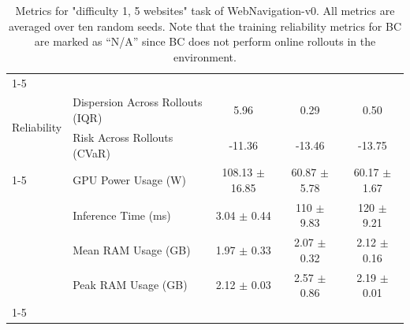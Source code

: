 \begin{table}[!htbp]
{\begin{tabular}{|l|l|c|c|c|}
\cline{1-5}
\midrule
\multicolumn{5}{|c|}{\textbf{Difficulty 1, 5 Websites (Inference)}} \\

\multirow[t]{2}{*}{Reliability} & Dispersion Across Rollouts (IQR) & 5.96 & 0.29 & 0.50 \\
 & Risk Across Rollouts (CVaR) & -11.36 & -13.46 & -13.75 \\
\cline{1-5}
\multirow[t]{4}{*}{System} & GPU Power Usage (W) & 108.13 $\pm$ 16.85 & 60.87 $\pm$ 5.78 & 60.17 $\pm$ 1.67 \\
 & Inference Time (ms) & 3.04 $\pm$ 0.44 & 110 $\pm$ 9.83 & 120 $\pm$ 9.21 \\

 & Mean RAM Usage (GB) & 1.97 $\pm$ 0.33 & 2.07 $\pm$ 0.32 & 2.12 $\pm$ 0.16 \\
 & Peak RAM Usage (GB) & 2.12 $\pm$ 0.03 & 2.57 $\pm$ 0.86 & 2.19 $\pm$ 0.01 \\
\cline{1-5}
\bottomrule
\end{tabular}
}
\caption{Metrics for "difficulty 1, 5 websites" task of WebNavigation-v0. All metrics are averaged over ten random seeds. Note that the training reliability metrics for BC are marked as ``N/A'' since BC does not perform online rollouts in the environment.}
\label{tab:appendix_metrics_webnav_difficulty_1_websites_5}
\end{table}


